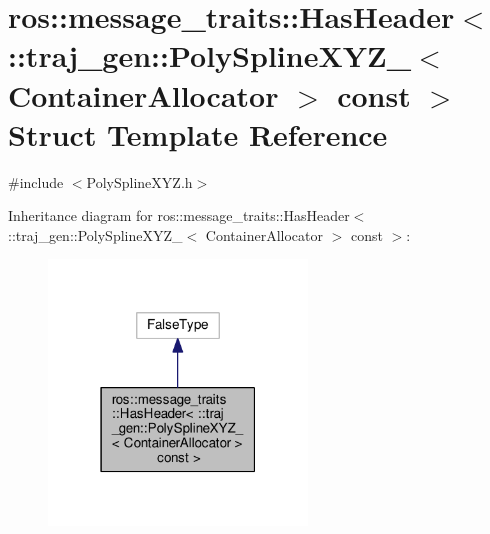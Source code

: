 \hypertarget{structros_1_1message__traits_1_1_has_header_3_01_1_1traj__gen_1_1_poly_spline_x_y_z___3_01_conta12af5fbc53800516b6d924908e03fe26}{}\section{ros\+:\+:message\+\_\+traits\+:\+:Has\+Header$<$ \+:\+:traj\+\_\+gen\+:\+:Poly\+Spline\+X\+Y\+Z\+\_\+$<$ Container\+Allocator $>$ const $>$ Struct Template Reference}
\label{structros_1_1message__traits_1_1_has_header_3_01_1_1traj__gen_1_1_poly_spline_x_y_z___3_01_conta12af5fbc53800516b6d924908e03fe26}


{\ttfamily \#include $<$Poly\+Spline\+X\+Y\+Z.\+h$>$}



Inheritance diagram for ros\+:\+:message\+\_\+traits\+:\+:Has\+Header$<$ \+:\+:traj\+\_\+gen\+:\+:Poly\+Spline\+X\+Y\+Z\+\_\+$<$ Container\+Allocator $>$ const $>$\+:
\nopagebreak
\begin{figure}[H]
\begin{center}
\leavevmode
\includegraphics[width=195pt]{structros_1_1message__traits_1_1_has_header_3_01_1_1traj__gen_1_1_poly_spline_x_y_z___3_01_contaca21aef213def750e894585cb77d12cd}
\end{center}
\end{figure}


